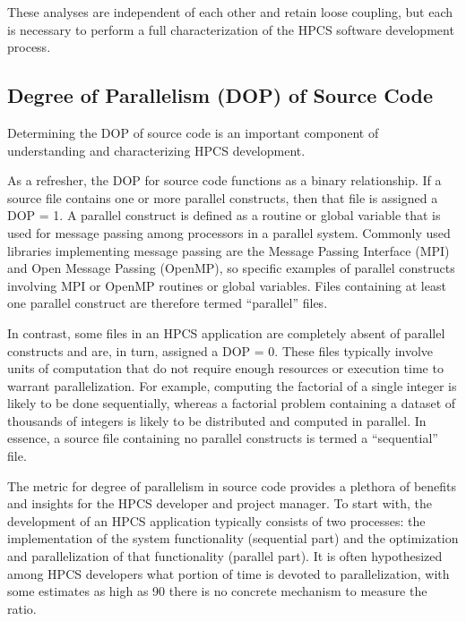 \documentclass[11pt,twocolumn]{article}
\begin{document}
These analyses are independent of each other and retain loose
coupling, but each is necessary to perform a full characterization of
the HPCS software development process.

\subsection{Degree of Parallelism (DOP) of Source Code}
Determining the DOP of source code is an important component of
understanding and characterizing HPCS development.

As a refresher, the DOP for source code functions as a binary
relationship.  If a source file contains one or more parallel
constructs, then that file is assigned a DOP = 1.  A parallel
construct is defined as a routine or global variable that is used for
message passing among processors in a parallel system.  Commonly used
libraries implementing message passing are the Message Passing
Interface (MPI) and Open Message Passing (OpenMP), so specific
examples of parallel constructs involving MPI or OpenMP routines or
global variables.  Files containing at least one parallel construct are therefore termed ``parallel'' files.

In contrast, some files in an HPCS application are completely absent
of parallel constructs and are, in turn, assigned a DOP = 0.  These
files typically involve units of computation that do not require
enough resources or execution time to warrant parallelization.  For
example, computing the factorial of a single integer is likely to be
done sequentially, whereas a factorial problem containing a dataset of
thousands of integers is likely to be distributed and computed in
parallel.  In essence, a source file containing no parallel constructs
is termed a ``sequential'' file.

The metric for degree of parallelism in source code provides a
plethora of benefits and insights for the HPCS developer and project
manager.  To start with, the development of an HPCS application
typically consists of two processes: the implementation of the system
functionality (sequential part) and the optimization and
parallelization of that functionality (parallel part).  It is often
hypothesized among HPCS developers what portion of time is devoted to
parallelization, with some estimates as high as 90%
there is no concrete mechanism to measure the ratio.
\end{document}
